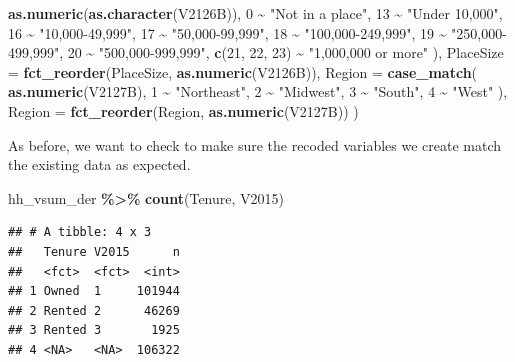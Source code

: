 \documentclass[
]{krantz}
\makeatletter
\newenvironment{Shaded}{\begin{snugshade}}{\end{snugshade}}
\newcommand{\AttributeTok}[1]{\textcolor[rgb]{0.27,0.27,0.27}{#1}}
\newcommand{\DecValTok}[1]{\textcolor[rgb]{0.06,0.06,0.06}{#1}}
\newcommand{\FunctionTok}[1]{\textcolor[rgb]{0.27,0.27,0.27}{\textbf{#1}}}
\newcommand{\NormalTok}[1]{#1}
\newcommand{\SpecialCharTok}[1]{\textcolor[rgb]{0.43,0.43,0.43}{\textbf{#1}}}
\newcommand{\StringTok}[1]{\textcolor[rgb]{0.5,0.5,0.5}{#1}}
\newenvironment{kframe}{%
\medskip{}
\setlength{\fboxsep}{.8em}
 \def\at@end@of@kframe{}%
 \ifinner\ifhmode%
  \def\at@end@of@kframe{\end{minipage}}%
  \begin{minipage}{\columnwidth}%
 \fi\fi%
 \def\FrameCommand##1{\hskip\@totalleftmargin \hskip-\fboxsep
 \colorbox{shadecolor}{##1}\hskip-\fboxsep
     \hskip-\linewidth \hskip-\@totalleftmargin \hskip\columnwidth}%
 \MakeFramed {\advance\hsize-\width
   \@totalleftmargin\z@ \linewidth\hsize
   \@setminipage}}%
 {\par\unskip\endMakeFramed%
 \at@end@of@kframe}
\renewenvironment{Shaded}{\begin{kframe}}{\end{kframe}}
\makeatother
\begin{document}
\begin{Shaded}
\begin{Highlighting}[]
      \FunctionTok{as.numeric}\NormalTok{(}\FunctionTok{as.character}\NormalTok{(V2126B)),}
      \DecValTok{0} \SpecialCharTok{\textasciitilde{}} \StringTok{"Not in a place"}\NormalTok{,}
      \DecValTok{13} \SpecialCharTok{\textasciitilde{}} \StringTok{"Under 10,000"}\NormalTok{,}
      \DecValTok{16} \SpecialCharTok{\textasciitilde{}} \StringTok{"10,000{-}49,999"}\NormalTok{,}
      \DecValTok{17} \SpecialCharTok{\textasciitilde{}} \StringTok{"50,000{-}99,999"}\NormalTok{,}
      \DecValTok{18} \SpecialCharTok{\textasciitilde{}} \StringTok{"100,000{-}249,999"}\NormalTok{,}
      \DecValTok{19} \SpecialCharTok{\textasciitilde{}} \StringTok{"250,000{-}499,999"}\NormalTok{,}
      \DecValTok{20} \SpecialCharTok{\textasciitilde{}} \StringTok{"500,000{-}999,999"}\NormalTok{,}
      \FunctionTok{c}\NormalTok{(}\DecValTok{21}\NormalTok{, }\DecValTok{22}\NormalTok{, }\DecValTok{23}\NormalTok{) }\SpecialCharTok{\textasciitilde{}} \StringTok{"1,000,000 or more"}
\NormalTok{    ),}
    \AttributeTok{PlaceSize =} \FunctionTok{fct\_reorder}\NormalTok{(PlaceSize, }\FunctionTok{as.numeric}\NormalTok{(V2126B)),}
    \AttributeTok{Region =} \FunctionTok{case\_match}\NormalTok{(}
      \FunctionTok{as.numeric}\NormalTok{(V2127B),}
      \DecValTok{1} \SpecialCharTok{\textasciitilde{}} \StringTok{"Northeast"}\NormalTok{,}
      \DecValTok{2} \SpecialCharTok{\textasciitilde{}} \StringTok{"Midwest"}\NormalTok{,}
      \DecValTok{3} \SpecialCharTok{\textasciitilde{}} \StringTok{"South"}\NormalTok{,}
      \DecValTok{4} \SpecialCharTok{\textasciitilde{}} \StringTok{"West"}
\NormalTok{    ),}
    \AttributeTok{Region =} \FunctionTok{fct\_reorder}\NormalTok{(Region, }\FunctionTok{as.numeric}\NormalTok{(V2127B))}
\NormalTok{  )}
\end{Highlighting}
\end{Shaded}

As before, we want to check to make sure the recoded variables we create match the existing data as expected.

\begin{Shaded}
\begin{Highlighting}[]
\NormalTok{hh\_vsum\_der }\SpecialCharTok{\%\textgreater{}\%} \FunctionTok{count}\NormalTok{(Tenure, V2015)}
\end{Highlighting}
\end{Shaded}

\begin{verbatim}
## # A tibble: 4 x 3
##   Tenure V2015      n
##   <fct>  <fct>  <int>
## 1 Owned  1     101944
## 2 Rented 2      46269
## 3 Rented 3       1925
## 4 <NA>   <NA>  106322
\end{verbatim}
\end{document}
